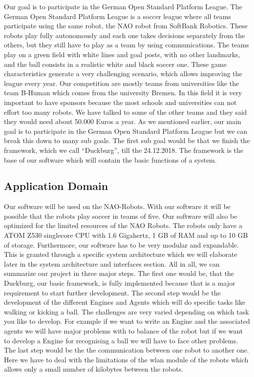 \documentclass[12pt]{article}
\theoremstyle{definition}
\begin{document}
Our goal is to participate in the German Open Standard Platform League. The German Open Standard Platform League is a soccer league where all teams participate using the same robot, the NAO robot from SoftBank Robotics. These robots play fully autonomously and each one takes decisions separately from the others, but they still have to play as a team by using communications. The teams play on a green field with white lines and goal posts, with no other landmarks, and the ball consists in a realistic white and black soccer one. These game characteristics generate a very challenging scenario, which allows improving the league every year. Our competition are mostly teams from universities like the team B-Human which comes from the university Bremen. In this field it is very important to have sponsors because the most schools and universities can not effort too many robots. We have talked to some of the other teams and they said they would need about 50.000 Euros a year. 
As we mentioned earlier, our main goal is to participate in the German Open Standard Platform League but we can break this down to many sub goals. The first sub goal would be that we finish the framework, which we call “Duckburg”, till the 24.12.2018. The framework is the base of our software which will  contain the basic functions of a system. 


\pagebreak

\subsection{Application Domain}
Our software will be used on the NAO-Robots. With our software it will be possible that the robots play soccer in teams of five. Our software will also be optimized for the limited resources of the NAO Robots. The robots only have a ATOM Z530 singlecore CPU with 1.6 Gigahertz, 1 GB of RAM and up to 10 GB of storage. Furthermore, our software has to be very modular and expandable. This is granted through a specific system architecture which we will elaborate later in the system architecture and interfaces section.
\newline
All in all, we can summarize our project in three major steps.
The first one would be, that the Duckburg, our basic framework, is fully implemented because that is a major requirement to start further development. 
\newline
The second step would be the development of the different Engines and Agents which will do specific tasks like walking or kicking a ball. The challenges are very varied depending on which task you like to develop. For example if we want to  write an Engine and the associated agents we will have major problems with to balance of the robot but if we want to develop a Engine for recognising a ball we will have to face other problems.
\newline
The last step would be the the communication between one robot to another one. Here we have to deal with the limitations of the wlan module of the robots which allows only a small number of kilobytes between the robots. 
\newline
\end{document}
